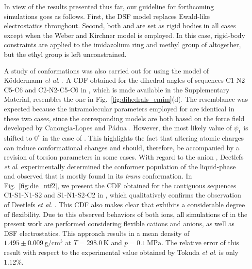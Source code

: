 \documentclass[3p,twocolumn]{elsarticle}
\begin{document}
In view of the results presented thus far, our guideline for forthcoming \ce{[emim][B(CN)_4]} simulations goes as follows.
First, the DSF model replaces Ewald-like electrostatics throughout.
Second, both \ce{[emim]^+} and \ce{[B(CN)_4]^-} are set as rigid bodies in all cases except when the Weber and Kirchner \cite{Weber_2016} model is employed.
In this case, rigid-body constraints are applied to the imidazolium ring and methyl group of \ce{[emim]^+} altogether, but the ethyl group is left unconstrained.

A study of conformations was also carried out for \ce{[emim][NTf_2]} using the model of K\"{o}ddermann \textit{et al}. \cite{Koddermann_2007}.
A CDF obtained for the dihedral angles of sequences C1-N2-C5-C6 and C2-N2-C5-C6 in \ce{[emim]^+}, which is made available in the Supplementary Material, resembles the one in Fig.~\ref{fig:dihedrals_emim}(d).
The resemblance was expected because the intramolecular parameters employed for \ce{[emim]^+} are identical in these two cases, since the corresponding models are both based on the force field developed by Canongia-Lopes and P\'{a}dua \cite{Canongia_Lopes_2006}.
However, the most likely value of $\psi_1$ is shifted to $0^{\circ}$ in the case of \ce{[emim][NTf_2]}.
This highlights the fact that altering atomic charges can induce conformational changes and should, therefore, be accompanied by a revision of torsion parameters in some cases.
With regard to the anion \ce{[NTf_2]^-}, Deetlefs \textit{et al}. \cite{Deetlefs_2006} experimentally determined the conformer population of the liquid-phase and observed that \ce{[NTf_2]^-} is mostly found in its \textit{trans} conformation.
In Fig.~\ref{fig:die_ntf2}, we present the CDF obtained for the contiguous sequences C1-S1-N1-S2 and S1-N1-S2-C2 in \ce{[NTf_2]^-}, which qualitatively confirms the observation of Deetlefs \textit{et al}. \cite{Deetlefs_2006}.
This CDF also makes clear that \ce{[NTf_2]^-} exhibits a considerable degree of flexibility.
Due to this observed behaviors of both ions, all simulations of \ce{[emim][NTf_2]} in the present work are performed considering flexible cations and anions, as well as DSF electrostatics.
This approach results in a mean density of $1.495 \pm 0.009 ~\mathrm{g/cm^3}$ at $T = 298.0~\mathrm{K}$ and $p = 0.1~\mathrm{MPa}$.
The relative error of this result with respect to the experimental value obtained by Tokuda \textit{et al}. \cite{Tokuda_2005} is only 1.12\%.
\end{document}
